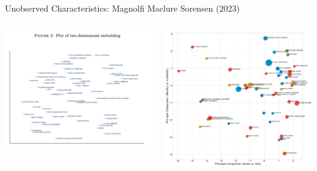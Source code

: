 \begin{frame}{Unobserved Characteristics: Magnolfi Maclure Sorensen (2023)}
\begin{columns}
\begin{column}{0.5\textwidth}
     \includegraphics[width=\textwidth]{resources/embeddings_2}      
\end{column}
\begin{column}{0.5\textwidth}
     \includegraphics[width=\textwidth]{resources/pca_01}      
\end{column}
\end{columns}
\end{frame}





